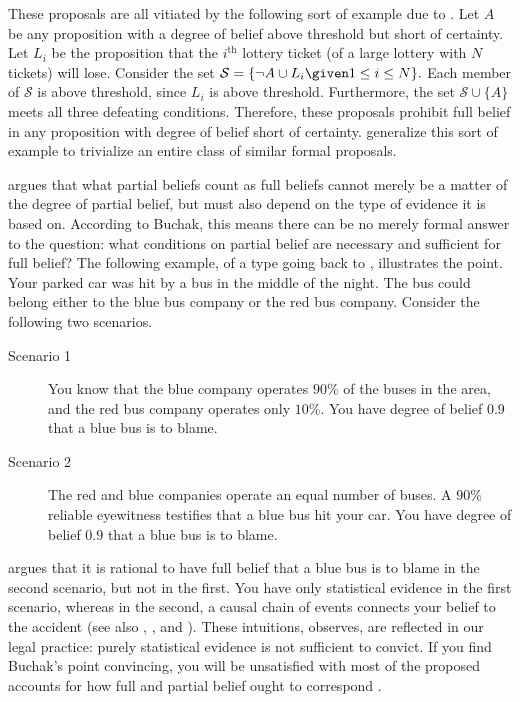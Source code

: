 These proposals are all vitiated by the following sort of example due to
\citet{korb1992collapse}. Let $A$ be any proposition with a degree of belief
above threshold but short of certainty. Let $L_i$ be the proposition that the
$i^\text{th}$ lottery ticket (of a large lottery with $N$ tickets) will lose.
Consider the set $\mathcal{S} = \{ \neg A \cup L_i  \given  1 \leq i \leq N \}.$
Each member of $\mathcal{S}$ is above threshold, since $L_i$ is above threshold.
Furthermore, the set $\mathcal{S} \cup \{ A\}$ meets all three defeating
conditions. Therefore, these proposals prohibit full belief in any proposition
with degree of belief short of certainty. \citet{douven2006generalizing}
generalize this sort of example to trivialize an entire class of similar formal
proposals.

\citet{buchak2014belief} argues that what partial beliefs count as full beliefs
cannot merely be a matter of the degree of partial belief, but must also depend
on the type of evidence it is based on. According to Buchak, this means there
can be no merely formal answer to the question: what conditions on partial
belief are necessary and sufficient for full belief? The following example, of a
type going back to \citet{thomson1986liability}, illustrates the point. Your
parked car was hit by a bus in the middle of the night. The bus could belong
either to the blue bus company or the red bus company. Consider the following
two scenarios.
\begin{description}
\item[Scenario 1] You know that the blue company operates $90\%$ of the buses
in the area, and the red bus company operates only $10\%$. You have degree of
belief $0.9$  that a blue bus is to blame.
\item[Scenario 2] The red and blue companies operate an equal number of buses.
A $90\%$ reliable eyewitness testifies that a blue bus hit your car. You have
degree of belief $0.9$ that a blue bus is to blame.
\end{description}
\citet{buchak2014belief} argues that it is rational to have full belief that a
blue bus is to blame in the second scenario, but not in the first. You have only
statistical evidence in the first scenario, whereas in the second, a causal
chain of events connects your belief to the accident (see also
\citealp{thomson1986liability}, \citealp{nelkin2000lottery}, and
\citealp{schauer2003profiles}). These intuitions, \citeauthor{buchak2014belief}
observes, are reflected in our legal practice: purely statistical evidence is
not sufficient to convict. If you find Buchak's point convincing, you will be
unsatisfied with most of the proposed accounts for how full and partial belief
ought to correspond \citep{staffel2016beliefs}. 

